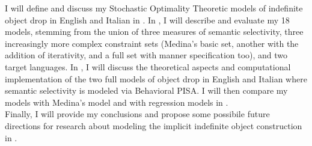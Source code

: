 I will define and discuss my Stochastic Optimality Theoretic models of indefinite object drop in English and Italian in . In , I will describe and evaluate my 18 models, stemming from the union of three measures of semantic selectivity, three increasingly more complex constraint sets (Medina's basic set, another with the addition of iterativity, and a full set with manner specification too), and two target languages. In , I will discuss the theoretical aspects and computational implementation of the two full models of object drop in English and Italian where semantic selectivity is modeled via Behavioral PISA. I will then compare my models with Medina's model and with regression models in .\\
Finally, I will provide my conclusions and propose some possibile future directions for research about modeling the implicit indefinite object construction in .


